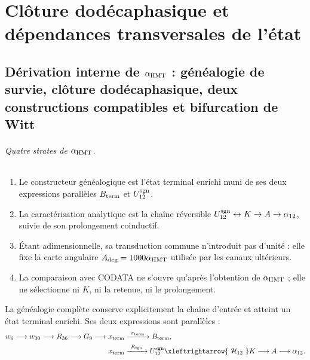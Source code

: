 \part{Clôture dodécaphasique et dépendances transversales de l'état}

\chapter[Dérivation interne de la constante de structure fine]{Dérivation interne de \texorpdfstring{\(\alpha_{\rm HMT}\)}{alpha HMT} : généalogie de survie, clôture dodécaphasique, deux constructions compatibles et bifurcation de Witt}
\label{chap:alpha-rev7}

\paragraph{Quatre strates de \(\alpha_{\rm HMT}\).}
\begin{enumerate}
 \item Le constructeur généalogique est l'état terminal enrichi muni de ses deux expressions parallèles \(B_{\rm term}\) et \(U_{12}^{\rm sgn}\).
 \item La caractérisation analytique est la chaîne réversible \(U_{12}^{\rm sgn}\leftrightarrow K\to A\to\alpha_{12}\), suivie de son prolongement coinductif.
 \item Étant adimensionnelle, sa transduction commune n'introduit pas d'unité : elle fixe la carte angulaire \(A_{\rm deg}=1000\alpha_{\rm HMT}\) utilisée par les canaux ultérieurs.
 \item La comparaison avec CODATA ne s'ouvre qu'après l'obtention de \(\alpha_{\rm HMT}\) ; elle ne sélectionne ni \(K\), ni la retenue, ni le prolongement.
\end{enumerate}
La généalogie complète conserve explicitement la chaîne d'entrée et atteint un état terminal enrichi. Ses deux expressions sont parallèles :
\[
\begin{aligned}
 w_6\longrightarrow w_{30}\longrightarrow R_{36}\longrightarrow G_9
 \longrightarrow x_{\rm term}
 &\xrightarrow{\ \pi_{\rm term}\ }B_{\rm term},\\
 x_{\rm term}
 &\xrightarrow{\ R_{\rm sgn}\ }U_{12}^{\rm sgn}
 \xleftrightarrow{\ \mathcal H_{12}\ }K
 \longrightarrow A\longrightarrow\alpha_{12}.
\end{aligned}
\]
